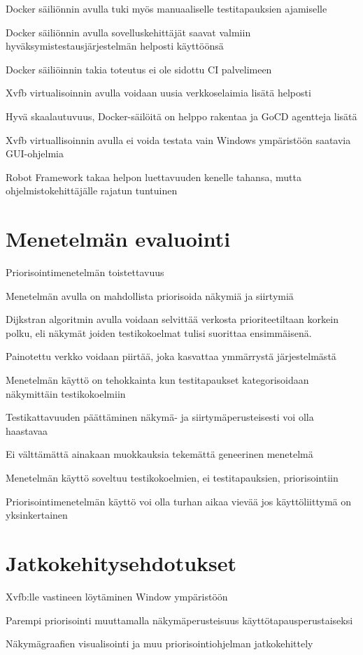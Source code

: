   Docker säiliönnin avulla tuki myös manuaaliselle testitapauksien ajamiselle

  Docker säiliönnin avulla sovelluskehittäjät saavat valmiin hyväksymistestausjärjestelmän helposti käyttöönsä

  Docker säiliöinnin takia toteutus ei ole sidottu CI palvelimeen

  Xvfb virtualisoinnin avulla voidaan uusia verkkoselaimia lisätä helposti

  Hyvä skaalautuvuus, Docker-säilöitä on helppo rakentaa ja GoCD agentteja lisätä



  Xvfb virtuallisoinnin avulla ei voida testata vain Windows ympäristöön saatavia GUI-ohjelmia

  Robot Framework takaa helpon luettavuuden kenelle tahansa, mutta ohjelmistokehittäjälle rajatun tuntuinen

\section{Menetelmän evaluointi} \label{ch:12_menetelman_evaluointi}

  Priorisointimenetelmän toistettavuus

  Menetelmän avulla on mahdollista priorisoida näkymiä ja siirtymiä

  Dijkstran algoritmin avulla voidaan selvittää verkosta prioriteetiltaan korkein polku, eli näkymät joiden testikokoelmat tulisi suorittaa ensimmäisenä.

  Painotettu verkko voidaan piirtää, joka kasvattaa ymmärrystä järjestelmästä

  Menetelmän käyttö on tehokkainta kun testitapaukset kategorisoidaan näkymittäin testikokoelmiin



  Testikattavuuden päättäminen näkymä- ja siirtymäperusteisesti voi olla haastavaa

  Ei välttämättä ainakaan muokkauksia tekemättä geneerinen menetelmä

  Menetelmän käyttö soveltuu testikokoelmien, ei testitapauksien, priorisointiin

  Priorisointimenetelmän käyttö voi olla turhan aikaa vievää jos käyttöliittymä on yksinkertainen

\section{Jatkokehitysehdotukset} \label{ch:12_jatkokehitysehdotukset}

  Xvfb:lle vastineen löytäminen Window ympäristöön

  Parempi priorisointi muuttamalla näkymäperusteisuus käyttötapausperustaiseksi

  Näkymägraafien visualisointi ja muu priorisointiohjelman jatkokehittely
